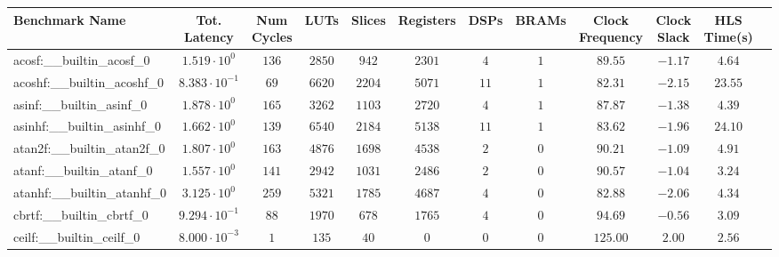 \begin{tabular}{|l|c|c|c|c|c|c|c|c|c|c|c|}
\hline
Benchmark Name                            & Tot. Latency            & Num Cycles & LUTs       & Slices    & Registers & DSPs    & BRAMs & Clock Frequency & Clock Slack & HLS Time(s) \\
\hline
acosf:\_\_builtin\_acosf\_0               & $ 1.519 \cdot 10^{0}  $ & $ 136    $ & $ 2850   $ & $ 942   $ & $ 2301  $ & $ 4   $ & $ 1 $ & $ 89.55       $ & $ -1.17   $ & $ 4.64    $ \\
acoshf:\_\_builtin\_acoshf\_0             & $ 8.383 \cdot 10^{-1} $ & $ 69     $ & $ 6620   $ & $ 2204  $ & $ 5071  $ & $ 11  $ & $ 1 $ & $ 82.31       $ & $ -2.15   $ & $ 23.55   $ \\
asinf:\_\_builtin\_asinf\_0               & $ 1.878 \cdot 10^{0}  $ & $ 165    $ & $ 3262   $ & $ 1103  $ & $ 2720  $ & $ 4   $ & $ 1 $ & $ 87.87       $ & $ -1.38   $ & $ 4.39    $ \\
asinhf:\_\_builtin\_asinhf\_0             & $ 1.662 \cdot 10^{0}  $ & $ 139    $ & $ 6540   $ & $ 2184  $ & $ 5138  $ & $ 11  $ & $ 1 $ & $ 83.62       $ & $ -1.96   $ & $ 24.10   $ \\
atan2f:\_\_builtin\_atan2f\_0             & $ 1.807 \cdot 10^{0}  $ & $ 163    $ & $ 4876   $ & $ 1698  $ & $ 4538  $ & $ 2   $ & $ 0 $ & $ 90.21       $ & $ -1.09   $ & $ 4.91    $ \\
atanf:\_\_builtin\_atanf\_0               & $ 1.557 \cdot 10^{0}  $ & $ 141    $ & $ 2942   $ & $ 1031  $ & $ 2486  $ & $ 2   $ & $ 0 $ & $ 90.57       $ & $ -1.04   $ & $ 3.24    $ \\
atanhf:\_\_builtin\_atanhf\_0             & $ 3.125 \cdot 10^{0}  $ & $ 259    $ & $ 5321   $ & $ 1785  $ & $ 4687  $ & $ 4   $ & $ 0 $ & $ 82.88       $ & $ -2.06   $ & $ 4.34    $ \\
cbrtf:\_\_builtin\_cbrtf\_0               & $ 9.294 \cdot 10^{-1} $ & $ 88     $ & $ 1970   $ & $ 678   $ & $ 1765  $ & $ 4   $ & $ 0 $ & $ 94.69       $ & $ -0.56   $ & $ 3.09    $ \\
ceilf:\_\_builtin\_ceilf\_0               & $ 8.000 \cdot 10^{-3} $ & $ 1      $ & $ 135    $ & $ 40    $ & $ 0     $ & $ 0   $ & $ 0 $ & $ 125.00      $ & $ 2.00    $ & $ 2.56    $ \\

\end{tabular}
